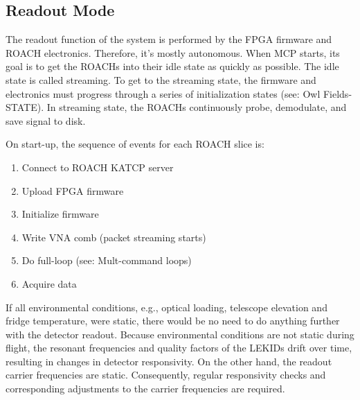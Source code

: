 \subsection{Readout Mode}
The readout function of the system is performed by the FPGA firmware and ROACH electronics. Therefore, it’s mostly autonomous. When MCP starts, its goal is to get the ROACHs into their idle state as quickly as possible. The idle state is called streaming. To get to the streaming state, the firmware and electronics must progress through a series of initialization states (see: Owl Fields-STATE). In streaming state, the ROACHs continuously probe, demodulate, and save signal to disk.

On start-up, the sequence of events for each ROACH slice is:
\begin{enumerate}
 \item  Connect to ROACH KATCP server
 \item  Upload FPGA firmware
 \item  Initialize firmware
 \item  Write VNA comb (packet streaming starts)
 \item  Do full-loop (see: Mult-command loops)
 \item  Acquire data
\end{enumerate}

If all environmental conditions, e.g., optical loading, telescope elevation and fridge temperature, were static, there would be no need to do anything further with the detector readout. Because environmental conditions are not static during flight, the resonant frequencies and quality factors of the LEKIDs drift over time, resulting in changes in detector responsivity. On the other hand, the readout carrier frequencies are static. Consequently, regular responsivity checks and corresponding adjustments to the carrier frequencies are required.


